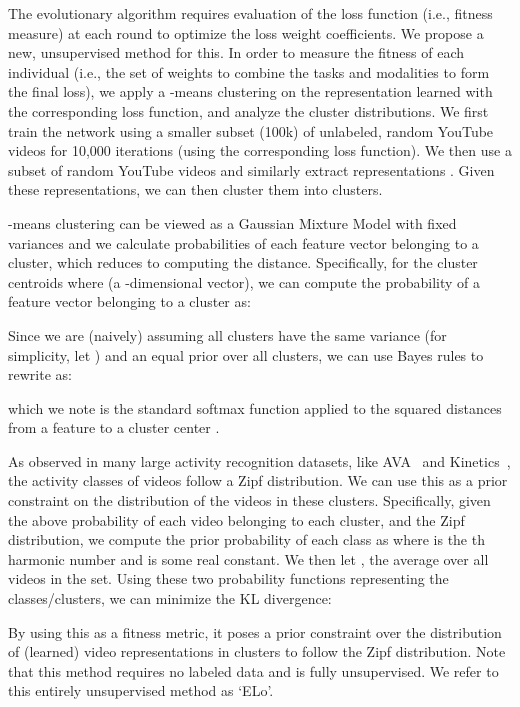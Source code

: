 \documentclass[10pt,twocolumn,letterpaper]{article}
\begin{document}
The evolutionary algorithm requires evaluation of the loss function (i.e., fitness measure) at each round to optimize the loss weight coefficients. We propose a new, unsupervised method for this. 
In order to measure the fitness of each individual (i.e., the set of weights to combine the tasks and modalities to form the final loss), we apply a  -means clustering on the representation learned with the corresponding loss function, and analyze the cluster distributions. We first train the network using a smaller subset (100k) of unlabeled, random YouTube videos for 10,000 iterations (using the corresponding loss function). 
We then use a subset of random YouTube videos and similarly extract representations . Given these representations, we can then cluster them into  clusters.

-means clustering can be viewed as a Gaussian Mixture Model with fixed variances and we calculate probabilities of each feature vector belonging to a cluster, which reduces to computing the distance. Specifically, for the cluster centroids  where  (a -dimensional vector), we can compute the probability of a feature vector  belonging to a cluster  as:

Since we are (naively) assuming all clusters have the same variance (for simplicity, let ) and an equal prior over all clusters, we can use Bayes rules to rewrite as:

which we note is the standard softmax function applied to the squared distances from a feature  to a cluster center .

As observed in many large activity recognition datasets, like AVA~\cite{ava2017} and Kinetics~\cite{kay2017kinetics}, the activity classes of videos follow a Zipf distribution. We can use this as a prior constraint on the distribution of the videos in these clusters. Specifically, given the above probability of each video belonging to each cluster, and the Zipf distribution, we compute the prior probability of each class as  where  is the th harmonic number and  is some real constant. We then let , the average over all videos in the set. Using these two probability functions representing the classes/clusters, we can minimize the KL divergence:

By using this as a fitness metric, it poses a prior constraint over the distribution of (learned) video representations in clusters to follow the Zipf distribution. Note that this method requires no labeled data and is fully unsupervised. We refer to this entirely unsupervised method as `ELo'.
\end{document}
